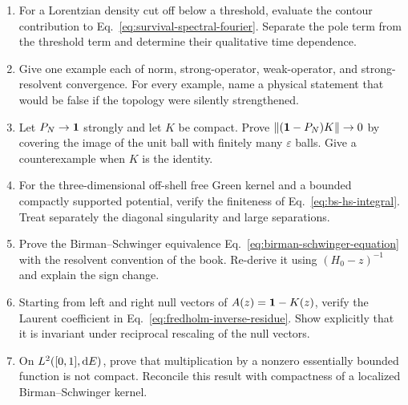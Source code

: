\begin{enumerate}[label=\textbf{I.\arabic*},leftmargin=*]
  \item For a Lorentzian density cut off below a threshold, evaluate the
  contour contribution to Eq.~\eqref{eq:survival-spectral-fourier}.  Separate
  the pole term from the threshold term and determine their qualitative time
  dependence.

  \item Give one example each of norm, strong-operator, weak-operator, and
  strong-resolvent convergence.  For every example, name a physical statement
  that would be false if the topology were silently strengthened.

  \item Let $P_N\to\mathbf{1}$ strongly and let $K$ be compact.  Prove
  $\|(\mathbf{1}-P_N)K\|\to0$ by covering the image of the unit ball with
  finitely many $\varepsilon$ balls.  Give a counterexample when $K$ is the
  identity.

  \item For the three-dimensional off-shell free Green kernel and a bounded
  compactly supported potential, verify the finiteness of
  Eq.~\eqref{eq:bs-hs-integral}.  Treat separately the diagonal singularity
  and large separations.

  \item Prove the Birman--Schwinger equivalence
  Eq.~\eqref{eq:birman-schwinger-equation} with the resolvent convention of
  the book.  Re-derive it using $(H_0-z)^{-1}$ and explain the sign change.

  \item Starting from left and right null vectors of
  $A(z)=\mathbf{1}-K(z)$, verify the Laurent coefficient in
  Eq.~\eqref{eq:fredholm-inverse-residue}.  Show explicitly that it is
  invariant under reciprocal rescaling of the null vectors.

  \item On $L^2([0,1],\mathrm{d} E)$, prove that multiplication by a nonzero
  essentially bounded function is not compact.  Reconcile this result with
  compactness of a localized Birman--Schwinger kernel.
\end{enumerate}

